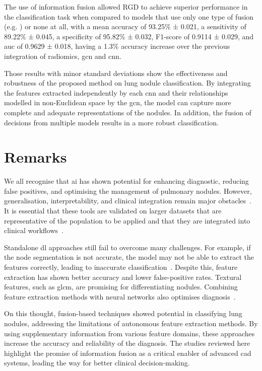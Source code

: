 The use of information fusion allowed RGD to achieve superior performance in the classification task when compared to models that use only one type of fusion (e.g. \cite{xie_fusing_2018}) or none at all, with a mean accuracy of 93.25\% ± 0.021, a sensitivity of 89.22\% ± 0.045, a specificity of 95.82\% ± 0.032, F1-score of 0.9114 ± 0.029, and \ac{auc} of 0.9629 ± 0.018, having a 1.3\% accuracy increase over the previous integration of radiomics, \ac{gcn} and \ac{cnn}.

Those results with minor standard deviations show the effectiveness and robustness of the proposed method on lung nodule classification. By integrating the features extracted independently by each \ac{cnn} and their relationships modelled in non-Euclidean space by the \ac{gcn}, the model can capture more complete and adequate representations of the nodules. In addition, the fusion of decisions from multiple models results in a more robust classification.


\section{Remarks}

We all recognise that \ac{ai} has shown potential for enhancing diagnostic, reducing false positives, and optimising the management of pulmonary nodules. However, generalisation, interpretability, and clinical integration remain major obstacles~\cite{liu_artificial_2022}. It is essential that these tools are validated on larger datasets that are representative of the population to be applied and that they are integrated into clinical workflows~\cite{wu_ai-enhanced_2024}.

Standalone \ac{dl} approaches still fail to overcome many challenges. For example, if the node segmentation is not accurate, the model may not be able to extract the features correctly, leading to inaccurate classification~\cite{gu_survey_2021, shaffie_generalized_2018}. Despite this, feature extraction has shown better accuracy and lower false-positive rates. Textural features, such as \ac{glcm}, are promising for differentiating nodules. Combining feature extraction methods with neural networks also optimises diagnosis~\cite{mathumetha_feature_2024}.

On this thought, fusion-based techniques showed potential in classifying lung nodules, addressing the limitations of autonomous feature extraction methods. By using supplementary information from various feature domains, these approaches increase the accuracy and reliability of the diagnosis. The studies reviewed here highlight the promise of information fusion as a critical enabler of advanced \ac{cad} systems, leading the way for better clinical decision-making.


